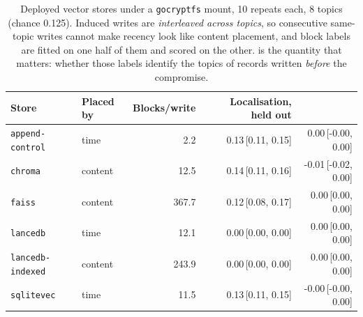 \begin{table}[t]
\centering
\caption{Deployed vector stores under a \texttt{gocryptfs} mount, 10
repeats each, 8 topics (chance 0.125). Induced writes are \emph{interleaved across
topics}, so consecutive same-topic writes cannot make recency look like content placement, and
block labels are fitted on one half of them and scored on the other. \advhist{} is the quantity
that matters: whether those labels identify the topics of records written \emph{before} the
compromise.}
\label{tab:e6}
\small
\setlength{\tabcolsep}{4pt}
\begin{tabular}{llrrr}
\toprule
Store & Placed by & Blocks/write & Localisation, held out & \advhist{} \\
\midrule
\texttt{append-control} & time & 2.2 & 0.13\,[0.11, 0.15] & 0.00\,[-0.00, 0.00] \\
\texttt{chroma} & content & 12.5 & 0.14\,[0.11, 0.16] & -0.01\,[-0.02, 0.00] \\
\texttt{faiss} & content & 367.7 & 0.12\,[0.08, 0.17] & 0.00\,[0.00, 0.00] \\
\texttt{lancedb} & time & 12.1 & 0.00\,[0.00, 0.00] & 0.00\,[0.00, 0.00] \\
\texttt{lancedb-indexed} & content & 243.9 & 0.00\,[0.00, 0.00] & 0.00\,[0.00, 0.00] \\
\texttt{sqlitevec} & time & 11.5 & 0.13\,[0.11, 0.15] & -0.00\,[-0.00, 0.00] \\
\bottomrule
\end{tabular}
\end{table}
